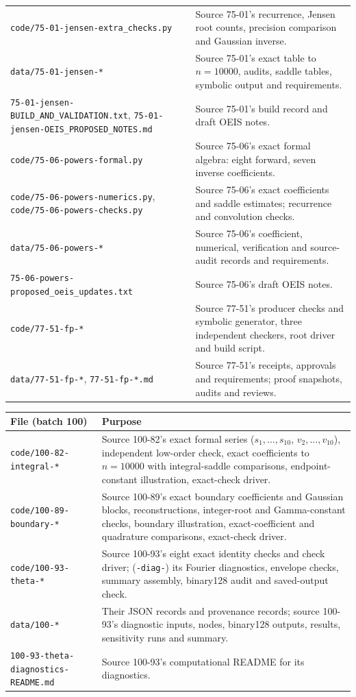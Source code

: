 \documentclass[11pt]{article}
\numberwithin{equation}{section}
\theoremstyle{definition}\newtheorem{definition}[theorem]{Definition}
\theoremstyle{remark}\newtheorem{remark}[theorem]{Remark}
\newcommand{\file}[1]{\nolinkurl{#1}}
\begin{document}
\begin{center}
\begin{tabular}{>{\raggedright\arraybackslash}p{.45\linewidth}>{\raggedright\arraybackslash}p{.48\linewidth}}
\file{code/75-01-jensen-extra_checks.py} & Source 75-01's recurrence, Jensen root counts, precision comparison and Gaussian inverse.\\
\file{data/75-01-jensen-*} & Source 75-01's exact table to $n=10000$, audits, saddle tables, symbolic output and requirements.\\
\file{75-01-jensen-BUILD_AND_VALIDATION.txt}, \file{75-01-jensen-OEIS_PROPOSED_NOTES.md} & Source 75-01's build record and draft OEIS notes.\\
\file{code/75-06-powers-formal.py} & Source 75-06's exact formal algebra: eight forward, seven inverse coefficients.\\
\file{code/75-06-powers-numerics.py}, \file{code/75-06-powers-checks.py} & Source 75-06's exact coefficients and saddle estimates; recurrence and convolution checks.\\
\file{data/75-06-powers-*} & Source 75-06's coefficient, numerical, verification and source-audit records and requirements.\\
\file{75-06-powers-proposed_oeis_updates.txt} & Source 75-06's draft OEIS notes.\\
\file{code/77-51-fp-*} & Source 77-51's producer checks and symbolic generator, three independent checkers, root driver and build script.\\
\file{data/77-51-fp-*}, \file{77-51-fp-*.md} & Source 77-51's receipts, approvals and requirements; proof snapshots, audits and reviews.\\
\bottomrule
\end{tabular}
\end{center}
\begin{center}
\small
\begin{tabular}{>{\raggedright\arraybackslash}p{.45\linewidth}>{\raggedright\arraybackslash}p{.48\linewidth}}
\toprule
File (batch 100) & Purpose\\
\midrule
\file{code/100-82-integral-*} & Source 100-82's exact formal series ($s_1,\dots,s_{10}$, $v_2,\dots,v_{10}$), independent low-order check, exact coefficients to $n=10000$ with integral-saddle comparisons, endpoint-constant illustration, exact-check driver.\\
\file{code/100-89-boundary-*} & Source 100-89's exact boundary coefficients and Gaussian blocks, reconstructions, integer-root and Gamma-constant checks, boundary illustration, exact-coefficient and quadrature comparisons, exact-check driver.\\
\file{code/100-93-theta-*} & Source 100-93's eight exact identity checks and check driver; (\file{-diag-}) its Fourier diagnostics, envelope checks, summary assembly, binary128 audit and saved-output check.\\
\file{data/100-*} & Their JSON records and provenance records; source 100-93's diagnostic inputs, nodes, binary128 outputs, results, sensitivity runs and summary.\\
\file{100-93-theta-diagnostics-README.md} & Source 100-93's computational README for its diagnostics.\\
\bottomrule
\end{tabular}
\end{center}
\end{document}
